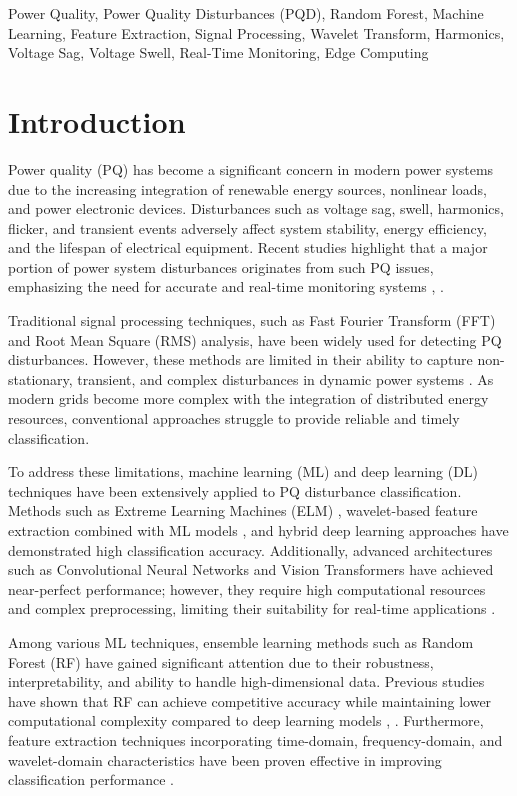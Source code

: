 \documentclass[conference]{IEEEtran}
\begin{document}
\begin{IEEEkeywords}
Power Quality, Power Quality Disturbances (PQD), Random Forest, Machine Learning, Feature Extraction, Signal Processing, Wavelet Transform, Harmonics, Voltage Sag, Voltage Swell, Real-Time Monitoring, Edge Computing
\end{IEEEkeywords}

\section{Introduction}
Power quality (PQ) has become a significant concern in modern power systems due to the increasing integration of renewable energy sources, nonlinear loads, and power electronic devices. Disturbances such as voltage sag, swell, harmonics, flicker, and transient events adversely affect system stability, energy efficiency, and the lifespan of electrical equipment. Recent studies highlight that a major portion of power system disturbances originates from such PQ issues, emphasizing the need for accurate and real-time monitoring systems \cite{b1}, \cite{b7}.

Traditional signal processing techniques, such as Fast Fourier Transform (FFT) and Root Mean Square (RMS) analysis, have been widely used for detecting PQ disturbances. However, these methods are limited in their ability to capture non-stationary, transient, and complex disturbances in dynamic power systems \cite{b8}. As modern grids become more complex with the integration of distributed energy resources, conventional approaches struggle to provide reliable and timely classification.

To address these limitations, machine learning (ML) and deep learning (DL) techniques have been extensively applied to PQ disturbance classification. Methods such as Extreme Learning Machines (ELM) \cite{b3}, wavelet-based feature extraction combined with ML models \cite{b6}, and hybrid deep learning approaches \cite{b4} have demonstrated high classification accuracy. Additionally, advanced architectures such as Convolutional Neural Networks and Vision Transformers have achieved near-perfect performance; however, they require high computational resources and complex preprocessing, limiting their suitability for real-time applications \cite{b10}.

Among various ML techniques, ensemble learning methods such as Random Forest (RF) have gained significant attention due to their robustness, interpretability, and ability to handle high-dimensional data. Previous studies have shown that RF can achieve competitive accuracy while maintaining lower computational complexity compared to deep learning models \cite{b2}, \cite{b5}. Furthermore, feature extraction techniques incorporating time-domain, frequency-domain, and wavelet-domain characteristics have been proven effective in improving classification performance \cite{b9}.
\end{document}
